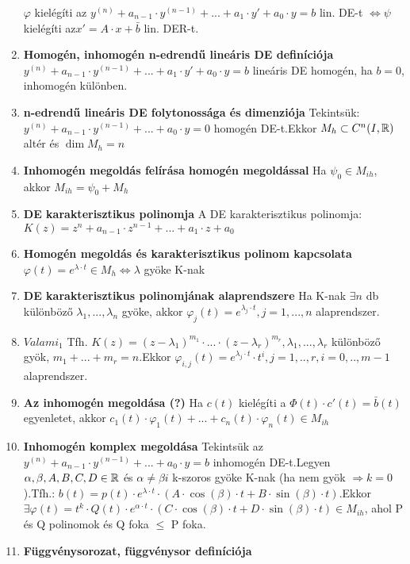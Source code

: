 \documentclass{article}
\begin{document}
\begin{enumerate}
	$\varphi$ kielégíti az $y^{(n)}+a_{n-1}\cdot y^{(n-1)}+...+a_1\cdot y'+a_0\cdot y=b$
	lin. DE-t $\Leftrightarrow\psi$ kielégíti az\br$x'=A\cdot x+\bar{b}$ lin. DER-t.
	\item\textbf{Homogén, inhomogén n-edrendű lineáris DE definíciója}\br
	$y^{(n)}+a_{n-1}\cdot y^{(n-1)}+...+a_1\cdot y'+a_0\cdot y = b$ lineáris DE
	homogén, ha $b=0$, inhomogén különben.
	\item\textbf{n-edrendű lineáris DE folytonossága és dimenziója}\br
	Tekintsük: $y^{(n)}+a_{n-1}\cdot y^{(n-1)}+...+a_0\cdot y=0$
	homogén DE-t.\br Ekkor $M_h\subset C^n (I, \mathbb{R})$ altér és $\dim M_h=n$
	\item\textbf{Inhomogén megoldás felírása homogén megoldással}\br
	Ha $\psi_0\in M_{ih}$, akkor $M_{ih}=\psi_0+M_h$
	\item\textbf{DE karakterisztikus polinomja}\br
	A DE karakterisztikus polinomja: $K(z)=z^n+a_{n-1}\cdot z^{n-1}+...+a_1
	\cdot z+a_0$
	\item\textbf{Homogén megoldás és karakterisztikus polinom kapcsolata}\br
	$\varphi(t)=e^{\lambda\cdot t}\in M_h \Leftrightarrow\lambda$ gyöke K-nak
	\item\textbf{DE karakterisztikus polinomjának alaprendszere}\br
	Ha K-nak $\exists n$ db különböző $\lambda_1, ... , \lambda_n$ gyöke, akkor
	$\varphi_{j}(t)=e^{\lambda_j\cdot t},j=1,...,n$ alaprendszer.
	\item\textbf{$Valami_1$}\br
	Tfh. $K(z)=(z-\lambda_1)^{m_1}\cdot...\cdot(z-\lambda_r)^{m_r},\lambda_1,
	... ,\lambda_r$ különböző gyök, $m_1 + ... + m_r = n$.\br Ekkor
	$\varphi_{i,j}(t)=e^{\lambda_j\cdot t}\cdot t^i,j=1,..,r,i=0,..,m-1$
	alaprendszer.
	\item\textbf{Az inhomogén megoldása (?)}\br
	Ha $c(t)$ kielégíti a $\Phi(t)\cdot c'(t) = \bar{b}(t)$ egyenletet, akkor
	$c_1(t)\cdot\varphi_1(t)+...+c_n(t)\cdot\varphi_n(t)\in M_{ih}$
	\item\textbf{Inhomogén komplex megoldása}\br
	Tekintsük az $y^{(n)}+a_{n-1}\cdot y^{(n-1)}+...+a_0\cdot y=b$ inhomogén
	DE-t.\br Legyen $\alpha,\beta,A,B,C,D\in\mathbb{R}$ és $\alpha\neq\beta i$ k-szoros
	gyöke K-nak (ha nem gyök $\Rightarrow k=0$).\br Tfh.: $b(t)=p(t)\cdot
	e^{\lambda\cdot t}\cdot(A\cdot \cos(\beta)\cdot t+B\cdot\sin(\beta)
	\cdot t).$\br Ekkor $\exists\varphi(t)=t^k\cdot Q(t)\cdot e^{\alpha\cdot t}
	\cdot(C\cdot\cos(\beta)\cdot t+D\cdot\sin(\beta)\cdot t)\in M_{ih}$,
	\br ahol P és Q polinomok és Q foka $\leq$ P foka.
	\newpage
	\item\textbf{Függvénysorozat, függvénysor definíciója}

\end{enumerate}
\end{document}
